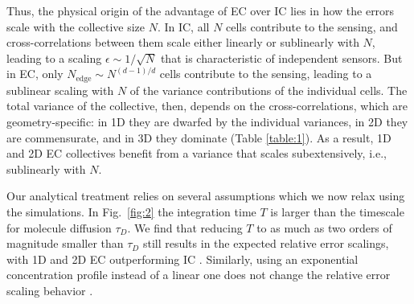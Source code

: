 Thus, the physical origin of the advantage of EC over IC lies in how the errors scale with the collective size $N$. In IC, all $N$ cells contribute to the sensing, and cross-correlations between them scale either linearly or sublinearly with $N$, leading to a scaling $\epsilon \sim 1/\sqrt{N}$ that is characteristic of independent sensors. But in EC, only $N_\text{edge} \sim N^{(d-1)/d}$ cells contribute to the sensing, leading to a sublinear scaling with $N$ of the variance contributions of the individual cells. The total variance of the collective, then, depends on the cross-correlations, which are geometry-specific: in 1D they are dwarfed by the individual variances, in 2D they are commensurate, and in 3D they dominate (Table \ref{table:1}). As a result, 1D and 2D EC collectives benefit from a variance that scales subextensively, i.e., sublinearly with $N$.

%
Our analytical treatment relies on several assumptions which we now relax using the simulations. In Fig.\ \ref{fig:2} the integration time $T$ is larger than the timescale for molecule diffusion $\tau_D$.
We find that reducing $T$ to as much as two orders of magnitude smaller than $\tau_D$ still results in the expected relative error scalings, with 1D and 2D EC outperforming IC \cite{supinfo}. Similarly, using an exponential concentration profile instead of a linear one does not change the relative error scaling behavior \cite{supinfo}.

